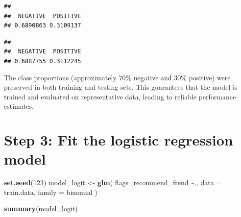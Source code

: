 \documentclass[
]{article}
\newenvironment{Shaded}{\begin{snugshade}}{\end{snugshade}}
\newcommand{\AttributeTok}[1]{\textcolor[rgb]{0.13,0.29,0.53}{#1}}
\newcommand{\DecValTok}[1]{\textcolor[rgb]{0.00,0.00,0.81}{#1}}
\newcommand{\FunctionTok}[1]{\textcolor[rgb]{0.13,0.29,0.53}{\textbf{#1}}}
\newcommand{\NormalTok}[1]{#1}
\newcommand{\OtherTok}[1]{\textcolor[rgb]{0.56,0.35,0.01}{#1}}
\newcommand{\SpecialCharTok}[1]{\textcolor[rgb]{0.81,0.36,0.00}{\textbf{#1}}}
\begin{document}
\begin{verbatim}
## 
##  NEGATIVE  POSITIVE 
## 0.6890863 0.3109137
\end{verbatim}

\begin{Shaded}
\end{Shaded}

\begin{verbatim}
## 
##  NEGATIVE  POSITIVE 
## 0.6887755 0.3112245
\end{verbatim}

The class proportions (approximately 70\% negative and 30\% positive)
were preserved in both training and testing sets. This guarantees that
the model is trained and evaluated on representative data, leading to
reliable performance estimates.

\section{Step 3: Fit the logistic regression
model}\label{step-3-fit-the-logistic-regression-model}

\begin{Shaded}
\begin{Highlighting}[]
\FunctionTok{set.seed}\NormalTok{(}\DecValTok{123}\NormalTok{)}
\NormalTok{model\_logit }\OtherTok{\textless{}{-}} \FunctionTok{glm}\NormalTok{(}
\NormalTok{  flags\_recommend\_frend }\SpecialCharTok{\textasciitilde{}}\NormalTok{.,}
  \AttributeTok{data =}\NormalTok{ train.data,}
  \AttributeTok{family =}\NormalTok{ binomial}
\NormalTok{)}

\FunctionTok{summary}\NormalTok{(model\_logit)}
\end{Highlighting}
\end{Shaded}
\end{document}
